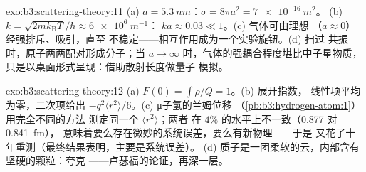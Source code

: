 \begin{solution}{exo:b3:scattering-theory:11}
(a) $a = \qty{5.3}{nm}$：$\sigma = 8\pi a^2 = \qty{7e-16}{m^2}$。
(b) $k = \sqrt{2mk_{\text{B}}T}/\hbar \approx \qty{6e6}{m^{-1}}$：
$ka \approx 0.03 \ll 1$。(c) 气体可由理想
（$a \approx 0$）经强排斥、吸引，直至
不稳定——相互作用成为一个实验旋钮。(d) 扫过
共振时，原子两两配对形成分子；当 $a \to
\infty$ 时，气体的强耦合程度堪比中子星物质，
只是以桌面形式呈现：借助散射长度做量子
模拟。
\end{solution}

\begin{solution}{exo:b3:scattering-theory:12}
(a) $F(0) = \int\rho/Q = 1$。(b) 展开指数，
线性项平均为零，二次项给出
$-q^2\langle r^2\rangle/6$。(c) μ子氢的兰姆位移
（\cref{pb:b3:hydrogen-atom:1}）用完全不同的方法
测定同一个 $\langle r^2\rangle$；两者
在 $4\%$ 的水平上不一致（0.877 对 \qty{0.841}{fm}），
意味着要么存在微妙的系统误差，要么有新物理——于是
又花了十年重测（最终结果表明，主要是系统误差）。
(d) 质子是一团柔软的云，内部含有坚硬的颗粒：夸克
——卢瑟福的论证，再深一层。
\end{solution}

